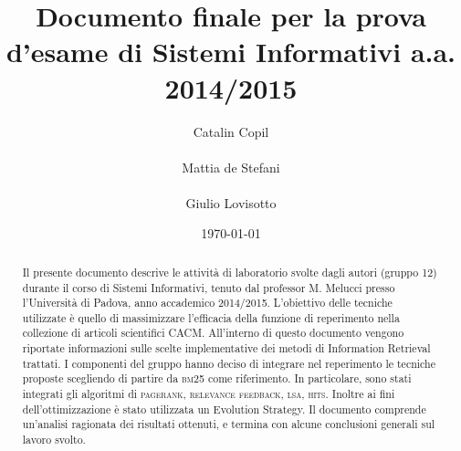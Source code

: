\documentclass{llncs}
\begin{document}
\title{Documento finale per la prova d'esame di Sistemi Informativi
  a.a. 2014/2015} 
\author{
	Catalin Copil\\\\ 
	Mattia de Stefani\\\\ 
	Giulio Lovisotto\\} 
\institute{}

\date{\today}

\maketitle
\begin{abstract}
Il presente documento descrive le attivit\`a di laboratorio svolte dagli autori (gruppo 12) durante il corso di Sistemi Informativi, tenuto dal professor M. Melucci presso l'Universit\`a di Padova, anno accademico 2014/2015. 
L'obiettivo delle tecniche utilizzate \`e quello di massimizzare l'efficacia della funzione di reperimento nella collezione di articoli scientifici CACM. All'interno di questo documento vengono riportate informazioni sulle scelte implementative dei metodi di Information Retrieval trattati. I componenti del gruppo hanno deciso di integrare nel reperimento le tecniche proposte scegliendo di partire da \textsc{bm25} come riferimento. In particolare, sono stati integrati gli algoritmi di \textsc{pagerank}, \textsc{relevance feedback}, \textsc{lsa}, \textsc{hits}. Inoltre ai fini dell'ottimizzazione \`e stato utilizzata un Evolution Strategy. Il documento comprende un'analisi ragionata dei risultati ottenuti, e termina con alcune conclusioni generali sul lavoro svolto.

	
	
\end{abstract}
\end{document}
